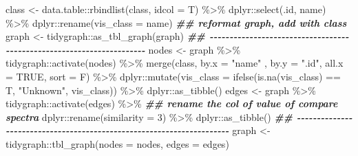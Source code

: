\documentclass[
]{article}
\newenvironment{Shaded}{\begin{snugshade}}{\end{snugshade}}
\newcommand{\AttributeTok}[1]{\textcolor[rgb]{0.77,0.63,0.00}{#1}}
\newcommand{\ConstantTok}[1]{\textcolor[rgb]{0.00,0.00,0.00}{#1}}
\newcommand{\DecValTok}[1]{\textcolor[rgb]{0.00,0.00,0.81}{#1}}
\newcommand{\DocumentationTok}[1]{\textcolor[rgb]{0.56,0.35,0.01}{\textbf{\textit{#1}}}}
\newcommand{\FunctionTok}[1]{\textcolor[rgb]{0.00,0.00,0.00}{#1}}
\newcommand{\NormalTok}[1]{#1}
\newcommand{\OtherTok}[1]{\textcolor[rgb]{0.56,0.35,0.01}{#1}}
\newcommand{\SpecialCharTok}[1]{\textcolor[rgb]{0.00,0.00,0.00}{#1}}
\newcommand{\StringTok}[1]{\textcolor[rgb]{0.31,0.60,0.02}{#1}}
\begin{document}
\begin{Shaded}
\begin{Highlighting}[]
\NormalTok{    class }\OtherTok{\textless{}{-}}\NormalTok{ data.table}\SpecialCharTok{::}\FunctionTok{rbindlist}\NormalTok{(class, }\AttributeTok{idcol =}\NormalTok{ T) }\SpecialCharTok{\%\textgreater{}\%}
\NormalTok{      dplyr}\SpecialCharTok{::}\FunctionTok{select}\NormalTok{(.id, name) }\SpecialCharTok{\%\textgreater{}\%}
\NormalTok{      dplyr}\SpecialCharTok{::}\FunctionTok{rename}\NormalTok{(}\AttributeTok{vis\_class =}\NormalTok{ name)}
    \DocumentationTok{\#\# reformat graph, add with class}
\NormalTok{    graph }\OtherTok{\textless{}{-}}\NormalTok{ tidygraph}\SpecialCharTok{::}\FunctionTok{as\_tbl\_graph}\NormalTok{(graph)}
    \DocumentationTok{\#\# {-}{-}{-}{-}{-}{-}{-}{-}{-}{-}{-}{-}{-}{-}{-}{-}{-}{-}{-}{-}{-}{-}{-}{-}{-}{-}{-}{-}{-}{-}{-}{-}{-}{-}{-}{-}{-}{-}{-}{-}{-}{-}{-}{-}{-}{-}{-}{-}{-}{-}{-}{-}{-}{-}{-}{-}{-}{-}{-}{-}{-}{-}{-}{-}{-}{-}{-}{-}{-}{-} }
\NormalTok{    nodes }\OtherTok{\textless{}{-}}\NormalTok{ graph }\SpecialCharTok{\%\textgreater{}\%}
\NormalTok{      tidygraph}\SpecialCharTok{::}\FunctionTok{activate}\NormalTok{(nodes) }\SpecialCharTok{\%\textgreater{}\%}
      \FunctionTok{merge}\NormalTok{(class, }\AttributeTok{by.x =} \StringTok{"name"}\NormalTok{ , }\AttributeTok{by.y =} \StringTok{".id"}\NormalTok{, }\AttributeTok{all.x =} \ConstantTok{TRUE}\NormalTok{, }\AttributeTok{sort =}\NormalTok{ F) }\SpecialCharTok{\%\textgreater{}\%}
\NormalTok{      dplyr}\SpecialCharTok{::}\FunctionTok{mutate}\NormalTok{(}\AttributeTok{vis\_class =} \FunctionTok{ifelse}\NormalTok{(}\FunctionTok{is.na}\NormalTok{(vis\_class) }\SpecialCharTok{==}\NormalTok{ T, }\StringTok{"Unknown"}\NormalTok{, vis\_class)) }\SpecialCharTok{\%\textgreater{}\%}
\NormalTok{      dplyr}\SpecialCharTok{::}\FunctionTok{as\_tibble}\NormalTok{()}
\NormalTok{    edges }\OtherTok{\textless{}{-}}\NormalTok{ graph }\SpecialCharTok{\%\textgreater{}\%}
\NormalTok{      tidygraph}\SpecialCharTok{::}\FunctionTok{activate}\NormalTok{(edges) }\SpecialCharTok{\%\textgreater{}\%}
      \DocumentationTok{\#\# rename the col of value of compare spectra}
\NormalTok{      dplyr}\SpecialCharTok{::}\FunctionTok{rename}\NormalTok{(}\AttributeTok{similarity =} \DecValTok{3}\NormalTok{) }\SpecialCharTok{\%\textgreater{}\%}
\NormalTok{      dplyr}\SpecialCharTok{::}\FunctionTok{as\_tibble}\NormalTok{()}
    \DocumentationTok{\#\# {-}{-}{-}{-}{-}{-}{-}{-}{-}{-}{-}{-}{-}{-}{-}{-}{-}{-}{-}{-}{-}{-}{-}{-}{-}{-}{-}{-}{-}{-}{-}{-}{-}{-}{-}{-}{-}{-}{-}{-}{-}{-}{-}{-}{-}{-}{-}{-}{-}{-}{-}{-}{-}{-}{-}{-}{-}{-}{-}{-}{-}{-}{-}{-}{-}{-}{-}{-}{-}{-} }
\NormalTok{    graph }\OtherTok{\textless{}{-}}\NormalTok{ tidygraph}\SpecialCharTok{::}\FunctionTok{tbl\_graph}\NormalTok{(}\AttributeTok{nodes =}\NormalTok{ nodes, }\AttributeTok{edges =}\NormalTok{ edges)}

\end{Highlighting}
\end{Shaded}
\end{document}
